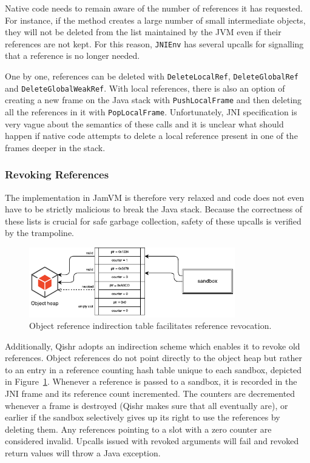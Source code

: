 \documentclass[a4paper,12pt,twoside,openright]{report}
\begin{document}
Native code needs to remain aware of the number of references it has requested. For instance, if the method creates a large number of small intermediate objects, they will not be deleted from the list maintained by the JVM even if their references are not kept. For this reason, \texttt{JNIEnv} has several upcalls for signalling that a reference is no longer needed. 

One by one, references can be deleted with \texttt{DeleteLocalRef}, \texttt{DeleteGlobalRef} and \texttt{DeleteGlobalWeakRef}. With local references, there is also an option of creating a new frame on the Java stack with \texttt{PushLocalFrame} and then deleting all the references in it with \texttt{PopLocalFrame}. Unfortunately, JNI specification is very vague about the semantics of these calls and it is unclear what should happen if native code attempts to delete a local reference present in one of the frames deeper in the stack.

\subsubsection{Revoking References}

The implementation in JamVM is therefore very relaxed and code does not even have to be strictly malicious to break the Java stack. Because the correctness of these lists is crucial for safe garbage collection, safety of these upcalls is verified by the trampoline.

\begin{figure}
	\centering
	\includegraphics[width=0.8\textwidth]{dia_indirection_table.pdf}
	\caption{Object reference indirection table facilitates reference revocation.}
	\label{fig:IndirectionTable}
\end{figure}

Additionally, Qishr adopts an indirection scheme which enables it to revoke old references. Object references do not point directly to the object heap but rather to an entry in a reference counting hash table unique to each sandbox, depicted in Figure~\ref{fig:IndirectionTable}. Whenever a reference is passed to a sandbox, it is recorded in the JNI frame and its reference count incremented. The counters are decremented whenever a frame is destroyed (Qishr makes sure that all eventually are), or earlier if the sandbox selectively gives up its right to use the references by deleting them. Any references pointing to a slot with a zero counter are considered invalid. Upcalls issued with revoked arguments will fail and revoked return values will throw a Java exception.
\end{document}
